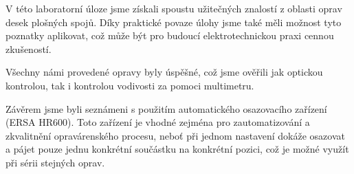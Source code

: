 V této laboratorní úloze jsme získali spoustu užitečných znalostí z oblasti oprav desek plošných spojů. Díky praktické povaze úlohy jsme také měli možnost tyto poznatky aplikovat, což může být pro budoucí elektrotechnickou praxi cennou zkušeností. 

Všechny námi provedené opravy byly úspěšné, což jsme ověřili jak optickou kontrolou, tak i kontrolou vodivosti za pomoci multimetru. 

Závěrem jsme byli seznámeni s použitím automatického osazovacího zařízení (ERSA HR600). Toto zařízení je vhodné zejména pro zautomatizování a zkvalitnění opravárenského procesu, neboť při jednom nastavení dokáže osazovat a pájet pouze jednu konkrétní součástku na konkrétní pozici, což je možné využít při sérii stejných oprav. 